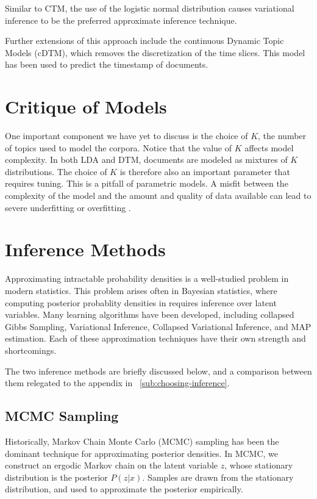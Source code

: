 \documentclass[letterpaper]{article}
\begin{document}
Similar to CTM, the use of the logistic normal distribution causes
variational inference to be the preferred approximate inference
technique.

Further extensions of this approach include the continuous Dynamic
Topic Models (cDTM), which removes the discretization of the time
slices. \cite{wang-2012-contin-time} This model has been used to
predict the timestamp of documents.

\section{Critique of Models}
One important component we have yet to discuss is the choice of $K$,
the number of topics used to model the corpora. Notice that the value
of $K$ affects model complexity. In both LDA and DTM, documents are
modeled as mixtures of $K$ distributions. The choice of $K$ is
therefore also an important parameter that requires tuning. This is a
pitfall of parametric models. A misfit between the complexity of the
model and the amount and quality of data available can lead to severe
underfitting or overfitting \cite{teh2011dirichlet}.

\section{Inference Methods}
\label{sec:inference}
Approximating intractable probability densities is a well-studied
problem in modern statistics. This problem arises often in Bayesian
statistics, where computing posterior probablity densities in requires
inference over latent variables. Many learning algorithms have been
developed, including collapsed Gibbs Sampling, Variational Inference,
Collapsed Variational Inference, and MAP estimation. Each of these
approximation techniques have their own strength and shortcomings.

The two inference methods are briefly discussed below, and a
comparison between them relegated to the appendix in
~\autoref{sub:choosing-inference}.

\subsection{MCMC Sampling}
\label{subsec:mcmc-sampling}
Historically, Markov Chain Monte Carlo (MCMC) sampling has been the
dominant technique for approximating posterior densities. In MCMC, we
construct an ergodic Markov chain on the latent variable $z$,
whose stationary distribution is the posterior $P( z | x)$.
Samples are drawn from the stationary distribution, and used to
approximate the posterior empirically.
\end{document}
